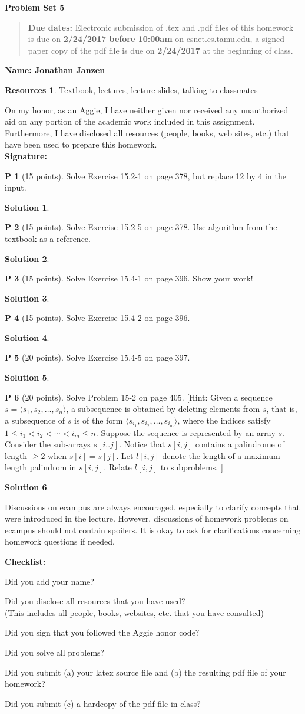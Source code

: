 \documentclass{article}
\theoremstyle{definition}
\newtheorem{problem}{P}
\newtheorem*{solution}{Solution}
\newtheorem*{resources}{Resources}
\newcommand{\name}[1]{\noindent\textbf{Name: #1}}
\newcommand{\honor}{\noindent On my honor, as an Aggie, I have neither
  given nor received any unauthorized aid on any portion of the
  academic work included in this assignment. Furthermore, I have
  disclosed all resources (people, books, web sites, etc.) that have
  been used to prepare this homework. \\[1ex]
 \textbf{Signature:} \underline{\hspace*{5cm}} }
\newcommand{\checklist}{\noindent\textbf{Checklist:}
\begin{compactitem}[$\Box$] 
\item Did you add your name? 
\item Did you disclose all resources that you have used? \\
(This includes all people, books, websites, etc. that you have consulted)
\item Did you sign that you followed the Aggie honor code? 
\item Did you solve all problems? 
\item Did you submit (a) your latex source file and (b) the resulting pdf file
  of your homework?
\item Did you submit (c) a hardcopy of the pdf file in class? 
\end{compactitem}
}
\newcommand{\problemset}[1]{\begin{center}\textbf{Problem Set #1}\end{center}}
\newcommand{\duedate}[2]{\begin{quote}\textbf{Due dates:} Electronic submission of .tex
    and .pdf files of this homework is due on \textbf{#1} on csnet.cs.tamu.edu, a signed paper copy
    of the pdf file is due on \textbf{#2} at the beginning of
    class. \end{quote} }
\begin{document}
\problemset{5}
\duedate{2/24/2017 before 10:00am}{2/24/2017}
\name{Jonathan Janzen}
\begin{resources}
Textbook, lectures, lecture slides, talking to classmates
\end{resources}
\honor
\newpage


\begin{problem}[15 points]
Solve Exercise 15.2-1 on page 378, but replace 12 by 4 in the input. 
\end{problem}
\begin{solution}
\end{solution}

\begin{problem}[15 points]
Solve Exercise 15.2-5 on page 378. Use algorithm from the textbook as
a reference. 
\end{problem}
\begin{solution}
\end{solution}

\begin{problem}[15 points]
Solve Exercise 15.4-1 on page 396. Show your work!
\end{problem}
\begin{solution}
\end{solution}

\begin{problem}[15 points]
Solve Exercise 15.4-2 on page 396. 
\end{problem}
\begin{solution}
\end{solution}


\begin{problem}[20 points]
Solve Exercise 15.4-5 on page 397. 
\end{problem}
\begin{solution}
\end{solution}

\begin{problem}[20 points]
Solve Problem 15-2 on page 405. [Hint: Given a sequence $s= \langle s_1,
s_2, \ldots, s_n\rangle$, a subsequence is obtained by deleting
elements from $s$, that is, a subsequence of $s$ is of the form 
$ \langle s_{i_{1}}, s_{i_2}, \ldots, s_{i_m}\rangle$,
where the indices satisfy $1\le i_{1} < i_{2} < \cdots < i_{m} \le n$.  
Suppose the sequence is represented by an array $s$. 
Consider the
sub-arrays $s[i..j]$. Notice that $s[i,j]$ contains a palindrome of
length $\ge 2$ when $s[i]=s[j]$. Let $l[i,j]$ denote the length of a
maximum length palindrom in $s[i,j]$. Relate $l[i,j]$ to subproblems. ] 
\end{problem}
\begin{solution}
\end{solution}




Discussions on ecampus are always encouraged, especially to clarify
concepts that were introduced in the lecture. However, discussions of
homework problems on ecampus should not contain spoilers. It is okay to
ask for clarifications concerning homework questions if needed. 
\medskip

\goodbreak
\checklist
\end{document}
